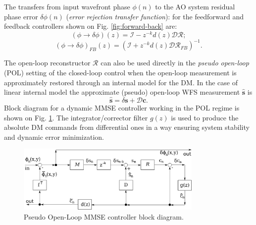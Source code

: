 The transfers from input wavefront phase $\phi(n)$ to the AO system
residual phase error $\delta \phi(n)$ (\emph{error rejection transfer
function}):  for the feedforward and
feedback controllers shown on Fig. \ref{fig:forward-back} are:
\begin{equation} \label{eq:forward-transfer}
	(\phi \rightarrow \delta \phi)(z) =
	\mathcal{I} -
	z^{-k} d(z) \mathcal{D} \mathcal{R};
\end{equation}
\begin{equation} \label{eq:feedback-transfer}
	(\phi \rightarrow \delta \phi)_{FB}(z) =
	( \mathcal{I}+z^{-k} d(z) \mathcal{D} \mathcal{R}_{FB} )^{-1}.
\end{equation}

The open-loop reconstructor $\mathcal{R}$ can also
be used directly in the \emph{pseudo open-loop}  (POL) setting of the closed-loop control when the open-loop
measurement is approximately restored
through an internal model for the DM. In the case of linear internal model the
approximate (pseudo) open-loop WFS measurement $\hat{\bm{s}}$ is
\begin{equation} \label{eq:wfs-restoration}
	\hat{\bm{s}} = \delta \bm{s} + \mathcal{D} \bm{c}.
\end{equation}
Block diagram for a dynamic MMSE controller working in the POL regime is
shown on Fig. \ref{fig:POL}. The integrator/corrector filter $g(z)$ is used to
produce the absolute DM
commands from differential ones in a way ensuring system stability and dynamic
error minimization.
\begin{figure}[htp]
\begin{center}
 \includegraphics[width = 0.8\textwidth]{POL.png}
\end{center}
\caption{Pseudo Open-Loop MMSE controller block diagram.}
\label{fig:POL}
\end{figure}

